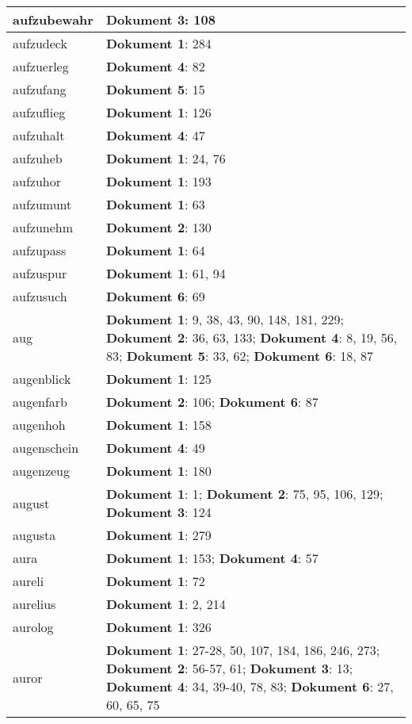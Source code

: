 \documentclass[a5paper]{article}
\begin{document}
\begin{longtable}[l]{|l|p{3in}|}
\hline
aufzubewahr & \textbf{Dokument 3}: 108 \\
\hline
aufzudeck & \textbf{Dokument 1}: 284 \\
\hline
aufzuerleg & \textbf{Dokument 4}: 82 \\
\hline
aufzufang & \textbf{Dokument 5}: 15 \\
\hline
aufzuflieg & \textbf{Dokument 1}: 126 \\
\hline
aufzuhalt & \textbf{Dokument 4}: 47 \\
\hline
aufzuheb & \textbf{Dokument 1}: 24, 76 \\
\hline
aufzuhor & \textbf{Dokument 1}: 193 \\
\hline
aufzumunt & \textbf{Dokument 1}: 63 \\
\hline
aufzunehm & \textbf{Dokument 2}: 130 \\
\hline
aufzupass & \textbf{Dokument 1}: 64 \\
\hline
aufzuspur & \textbf{Dokument 1}: 61, 94 \\
\hline
aufzusuch & \textbf{Dokument 6}: 69 \\
\hline
aug & \textbf{Dokument 1}: 9, 38, 43, 90, 148, 181, 229; \textbf{Dokument 2}: 36, 63, 133; \textbf{Dokument 4}: 8, 19, 56, 83; \textbf{Dokument 5}: 33, 62; \textbf{Dokument 6}: 18, 87 \\
\hline
augenblick & \textbf{Dokument 1}: 125 \\
\hline
augenfarb & \textbf{Dokument 2}: 106; \textbf{Dokument 6}: 87 \\
\hline
augenhoh & \textbf{Dokument 1}: 158 \\
\hline
augenschein & \textbf{Dokument 4}: 49 \\
\hline
augenzeug & \textbf{Dokument 1}: 180 \\
\hline
august & \textbf{Dokument 1}: 1; \textbf{Dokument 2}: 75, 95, 106, 129; \textbf{Dokument 3}: 124 \\
\hline
augusta & \textbf{Dokument 1}: 279 \\
\hline
aura & \textbf{Dokument 1}: 153; \textbf{Dokument 4}: 57 \\
\hline
aureli & \textbf{Dokument 1}: 72 \\
\hline
aurelius & \textbf{Dokument 1}: 2, 214 \\
\hline
aurolog & \textbf{Dokument 1}: 326 \\
\hline
auror & \textbf{Dokument 1}: 27-28, 50, 107, 184, 186, 246, 273; \textbf{Dokument 2}: 56-57, 61; \textbf{Dokument 3}: 13; \textbf{Dokument 4}: 34, 39-40, 78, 83; \textbf{Dokument 6}: 27, 60, 65, 75 \\

\end{longtable}
\end{document}
